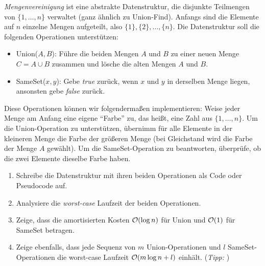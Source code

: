 \documentclass{uebung_cs}
\begin{document}
\begin{exercise}[Mengenvereinigung]
    \emph{Mengenvereinigung} ist eine abstrakte Datenstruktur, die disjunkte Teilmengen von $\{1,\dots,n\}$ verwaltet (ganz ähnlich zu Union-Find).
    Anfangs sind die Elemente auf $n$ einzelne Mengen aufgeteilt, also $\{1\}, \{2\}, \dots,\{n\}$.
    Die Datenstruktur soll die folgenden Operationen unterstützen:
    \begin{itemize}
        \item Union($A,B$): Führe die beiden Mengen $A$ und $B$ zu einer neuen Menge $C = A \cup B$ zusammen und lösche die alten Mengen $A$ und $B$.
        \item SameSet($x,y$): Gebe \textit{true} zurück, wenn $x$ und $y$ in derselben Menge liegen, ansonsten gebe \textit{false} zurück.
    \end{itemize}
    Diese Operationen können wir folgendermaßen implementieren: Weise jeder Menge am Anfang eine eigene \enquote{Farbe} zu, das heißt, eine Zahl aus $\{1,\dots,n\}$. Um die Union-Operation zu unterstützen, übernimm für alle Elemente in der kleineren Menge die Farbe der größeren Menge (bei Gleichstand wird die Farbe der Menge $A$ gewählt). Um die SameSet-Operation zu beantworten, überprüfe, ob die zwei Elemente dieselbe Farbe haben.

    \begin{enumerate}
        \item\athome Schreibe die Datenstruktur mit ihren beiden Operationen als Code oder Pseudocode auf.
        \item\athome Analysiere die \textit{worst-case} Laufzeit der beiden Operationen.
        \item\athome\mittel Zeige, dass die amortisierten Kosten $\mathcal{O}(\log n)$ für Union und $\mathcal{O}(1)$ für SameSet betragen.
        \item\atschool\note Zeige ebenfalls, dass jede Sequenz von $m$ Union-Operationen und $l$ SameSet-Operationen die worst-case Laufzeit $\mathcal{O}(m \log n + l)$ einhält.
        (\emph{Tipp: })
    \end{enumerate}
\end{exercise}

\clearpage
\end{document}
